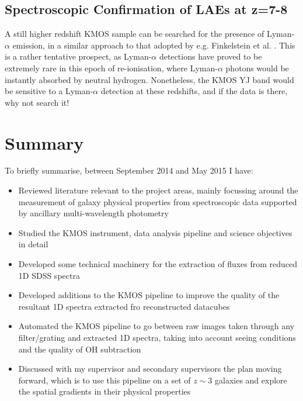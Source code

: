 \documentclass{literature}
\begin{document}
\subsection{Spectroscopic Confirmation of LAEs at z=7-8}\label{subsec:LAEs}
A still higher redshift KMOS sample can be searched for the presence of Lyman-$\alpha$ emission, in a similar approach to that adopted by e.g. Finkelstein et al. \citep{Finkelstein2013}. This is a rather tentative prospect, as Lyman-$\alpha$ detections have proved to be extremely rare in this epoch of re-ionisation, where Lyman-$\alpha$ photons would be instantly absorbed by neutral hydrogen. Nonetheless, the KMOS YJ band would be sensitive to a Lyman-$\alpha$ detection at these redshifts, and if the data is there, why not search it!

\section{Summary}
To briefly summarise, between September 2014 and May 2015 I have: 
\begin{itemize}
	\item Reviewed literature relevant to the project areas, mainly focussing around the measurement of galaxy physical properties from spectroscopic data supported by ancillary multi-wavelength photometry
	\item Studied the KMOS instrument, data analysis pipeline and science objectives in detail 
	\item Developed some technical machinery for the extraction of fluxes from reduced 1D SDSS spectra 
	\item Developed additions to the KMOS pipeline to improve the quality of the resultant 1D spectra extracted fro reconstructed datacubes 
	\item Automated the KMOS pipeline to go between raw images taken through any filter/grating and extracted 1D spectra, taking into account seeing conditions and the quality of OH subtraction 
	\item Discussed with my supervisor and secondary supervisors the plan moving forward, which is to use this pipeline on a set of $z\sim 3$ galaxies and explore the spatial gradients in their physical properties 
\end{itemize}

\clearpage 

%

\end{document}
